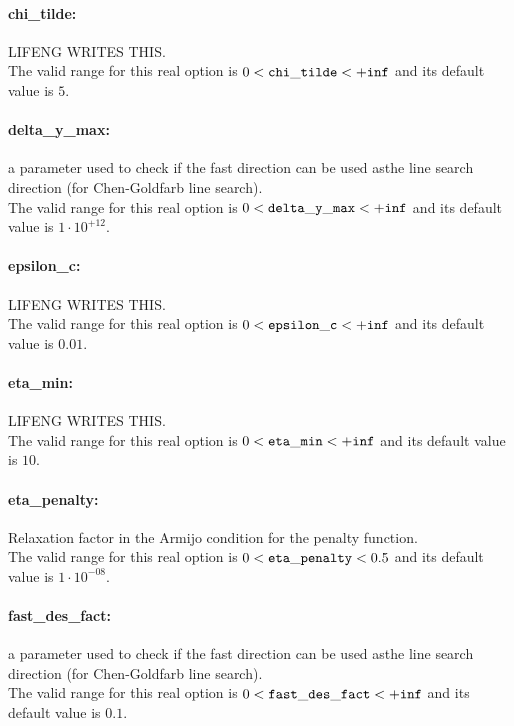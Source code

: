 \paragraph{chi\_tilde:}\label{opt:chi_tilde} LIFENG WRITES THIS. \\
 The valid range for this real option is 
$0 <  {\tt chi\_tilde } <  {\tt +inf}$
and its default value is $5$.


\paragraph{delta\_y\_max:}\label{opt:delta_y_max} a parameter used to check if the fast direction can be used asthe line search direction (for Chen-Goldfarb line search). \\
 The valid range for this real option is 
$0 <  {\tt delta\_y\_max } <  {\tt +inf}$
and its default value is $1 \cdot 10^{+12}$.


\paragraph{epsilon\_c:}\label{opt:epsilon_c} LIFENG WRITES THIS. \\
 The valid range for this real option is 
$0 <  {\tt epsilon\_c } <  {\tt +inf}$
and its default value is $0.01$.


\paragraph{eta\_min:}\label{opt:eta_min} LIFENG WRITES THIS. \\
 The valid range for this real option is 
$0 <  {\tt eta\_min } <  {\tt +inf}$
and its default value is $10$.


\paragraph{eta\_penalty:}\label{opt:eta_penalty} Relaxation factor in the Armijo condition for the penalty function. \\
 The valid range for this real option is 
$0 <  {\tt eta\_penalty } <  0.5$
and its default value is $1 \cdot 10^{-08}$.


\paragraph{fast\_des\_fact:}\label{opt:fast_des_fact} a parameter used to check if the fast direction can be used asthe line search direction (for Chen-Goldfarb line search). \\
 The valid range for this real option is 
$0 <  {\tt fast\_des\_fact } <  {\tt +inf}$
and its default value is $0.1$.


